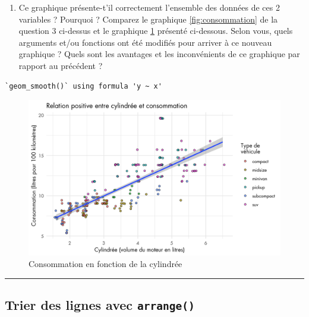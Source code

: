 \documentclass[
  a4paper,
]{article}
\providecommand{\tightlist}{%
  \setlength{\itemsep}{0pt}\setlength{\parskip}{0pt}}
\begin{document}
\begin{enumerate}
\def\labelenumi{\arabic{enumi}.}
\setcounter{enumi}{3}
\tightlist
\item
  Ce graphique présente-t'il correctement l'ensemble des données de ces 2 variables ? Pourquoi ? Comparez le graphique \ref{fig:consommation} de la question 3 ci-dessus et le graphique \ref{fig:consommation2} présenté ci-dessous. Selon vous, quels arguments et/ou fonctions ont été modifiés pour arriver à ce nouveau graphique ? Quels sont les avantages et les inconvénients de ce graphique par rapport au précédent ?
\end{enumerate}

\begin{verbatim}
`geom_smooth()` using formula 'y ~ x'
\end{verbatim}

\begin{figure}[htpb]

{\centering \includegraphics[width=0.9\linewidth]{figure/consommation2-1} 

}

\caption{Consommation en fonction de la cylindrée}\label{fig:consommation2}
\end{figure}

\begin{center}\rule{0.5\linewidth}{0.5pt}\end{center}

\hypertarget{arrange}{%
\subsection{\texorpdfstring{Trier des lignes avec \texttt{arrange()}}{Trier des lignes avec arrange()}}\label{arrange}}
\end{document}
